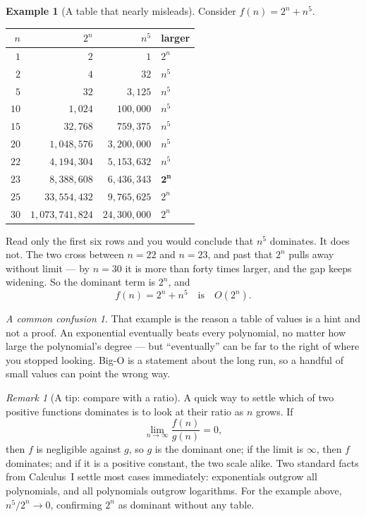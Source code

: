\documentclass[11pt]{article}
\theoremstyle{plain}
\theoremstyle{definition}
\newtheorem{ex}{Example}[section]
\theoremstyle{remark}
\newtheorem*{rmk}{Remark}
\newtheorem*{warn}{A common confusion}
\begin{document}
\begin{ex}[A table that nearly misleads]
Consider $f(n) = 2^{n} + n^{5}$.

\begin{center}
\renewcommand{\arraystretch}{1.25}
\begin{tabular}{@{}r r r l@{}}
\toprule
$n$ & $2^{n}$ & $n^{5}$ & larger \\
\midrule
$1$  & $2$             & $1$          & $2^{n}$ \\
$2$  & $4$             & $32$         & $n^{5}$ \\
$5$  & $32$            & $3{,}125$    & $n^{5}$ \\
$10$ & $1{,}024$       & $100{,}000$  & $n^{5}$ \\
$15$ & $32{,}768$      & $759{,}375$  & $n^{5}$ \\
$20$ & $1{,}048{,}576$ & $3{,}200{,}000$ & $n^{5}$ \\
$22$ & $4{,}194{,}304$ & $5{,}153{,}632$ & $n^{5}$ \\
$23$ & $8{,}388{,}608$ & $6{,}436{,}343$ & $\mathbf{2^{n}}$ \\
$25$ & $33{,}554{,}432$ & $9{,}765{,}625$ & $2^{n}$ \\
$30$ & $1{,}073{,}741{,}824$ & $24{,}300{,}000$ & $2^{n}$ \\
\bottomrule
\end{tabular}
\end{center}

\noindent Read only the first six rows and you would conclude that $n^{5}$
dominates. It does not. The two cross between $n=22$ and $n=23$, and past that
$2^{n}$ pulls away without limit --- by $n=30$ it is more than forty times
larger, and the gap keeps widening. So the dominant term is $2^{n}$, and
\[
  f(n) = 2^{n}+n^{5} \quad\text{is}\quad O(2^{n}) .
\]
\end{ex}

\begin{warn}
That example is the reason a table of values is a hint and not a proof. An
exponential eventually beats every polynomial, no matter how large the
polynomial's degree --- but ``eventually'' can be far to the right of where you
stopped looking. Big-O is a statement about the long run, so a handful of small
values can point the wrong way.
\end{warn}

\begin{rmk}[A tip: compare with a ratio]
A quick way to settle which of two positive functions dominates is to look at
their ratio as $n$ grows. If
\[
  \lim_{n\to\infty}\frac{f(n)}{g(n)} = 0 ,
\]
then $f$ is negligible against $g$, so $g$ is the dominant one; if the limit is
$\infty$, then $f$ dominates; and if it is a positive constant, the two scale
alike. Two standard facts from Calculus~I settle most cases immediately:
exponentials outgrow all polynomials, and all polynomials outgrow logarithms.
For the example above, $n^{5}/2^{n}\to0$, confirming $2^{n}$ as dominant without
any table.
\end{rmk}
\end{document}
